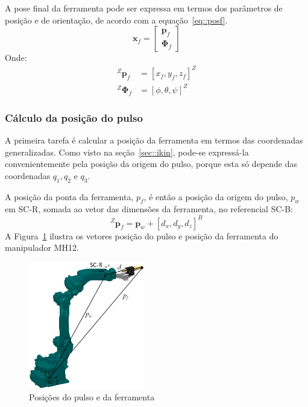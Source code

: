 A pose final da ferramenta pode ser expressa em termos dos parâmetros
de posição e de orientação, de acordo com a equação~\ref{eq::posf}.
%
\begin{equation}
	\mathbf{x}_{f} = \begin{bmatrix}
		\mathbf{p}_{f} \\ \boldsymbol{\Phi}_{f}
	\end{bmatrix}
	\label{eq::posf}	
\end{equation}
%
Onde:
%
\begin{align}
^Z\mathbf{p}_{f} &= [x_f,y_f,z_f]^Z \\
^Z\boldsymbol{\Phi}_{f} &= [\phi,\theta,\psi]^Z
\end{align}
%



\subsubsection{Cálculo da posição do pulso}

A primeira tarefa é calcular a posição da ferramenta em termos das
coordenadas generalizadas.
Como visto na seção~\ref{sec::ikin}, pode-se expressá-la convenientemente
pela posição da origem do pulso, porque esta só depende das coordenadas $q_1,
q_2$ e $q_3$.

A posição da ponta da ferramenta, $p_{f}$, é então a posição da origem do pulso,
$p_{w}$ em SC-R, somada ao vetor das dimensões da ferramenta, no referencial
SC-B:
%
\begin{equation}
	^Z\mathbf{p}_{f} = \mathbf{p}_{w} + [d_{x}, d_{y}, d_{z}]^B \label{eq::posf}
\end{equation}
%
A Figura~\ref{fig::pwpf} ilustra os vetores posição do pulso e posição da
ferramenta do manipulador MH12.

\begin{figure}[h]
	\centering 
 	\includegraphics[width=0.45\textwidth]{figs/pwpf}
 	\caption{Posições do pulso e da ferramenta}
 	\label{fig::pwpf}
\end{figure}

